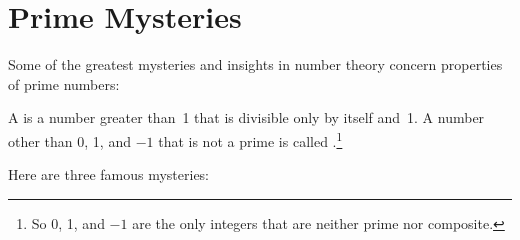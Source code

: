 \begin{problems}

\practiceproblems
{}

\classproblems
{}

\homeworkproblems
{}

\end{problems}

\section{Prime Mysteries}

Some of the greatest mysteries and insights in number theory concern
properties of prime numbers:
\begin{definition}
A  is a number greater than~1 that is divisible only by
itself and~1.  A number other than 0, 1, and $-1$ that is not a prime
is called .\footnote{So 0, 1, and $-1$ are the only
  integers that are neither prime nor composite.}
\end{definition}

Here are three famous mysteries:



